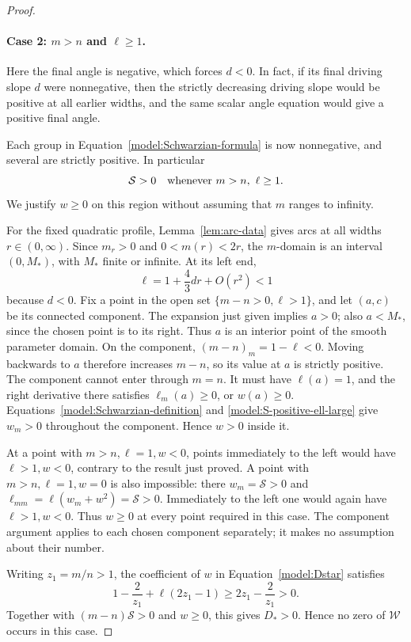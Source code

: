 \begin{proof}
\paragraph{Case 2: \(m>n\) and \(\ell\ge1\).}
Here the final angle is negative, which forces \(d<0\).
In fact, if its final driving slope \(d\) were nonnegative, then the
strictly decreasing driving slope would be positive at all earlier
widths, and the same scalar angle equation would give a positive final
angle.

Each group in Equation~\eqref{model:Schwarzian-formula} is now
nonnegative, and several are strictly positive.  In particular
\begin{equation}
 \mathcal S>0
 \quad\hbox{whenever }m>n,\ \ell\ge1.
 \label{model:S-positive-ell-large}
\end{equation}
We justify \(w\ge0\) on this region without assuming that \(m\)
ranges to infinity.

For the fixed quadratic profile, Lemma~\ref{lem:arc-data} gives arcs at
all widths \(r\in(0,\infty)\).  Since \(m_r>0\) and \(0<m(r)<2r\),
the \(m\)-domain is an interval \((0,M_*)\), with \(M_*\) finite or
infinite.  At its left end,
\[
 \ell=1+\frac43dr+O(r^2)<1
\]
because \(d<0\).
Fix a point in the open set \(\{m-n>0,\ell>1\}\), and let \((a,c)\)
be its connected component.  The expansion just given implies \(a>0\);
also \(a<M_*\), since the chosen point is to its right.
Thus \(a\) is an interior point of the smooth parameter domain.
On the component,
\((m-n)_m=1-\ell<0\).  Moving backwards to \(a\) therefore increases
\(m-n\), so its value at \(a\) is strictly positive.
The component cannot enter through \(m=n\).  It must have
\(\ell(a)=1\), and the right derivative there satisfies
\(\ell_m(a)\ge0\), or \(w(a)\ge0\).
Equations~\eqref{model:Schwarzian-definition} and
\eqref{model:S-positive-ell-large} give \(w_m>0\) throughout the
component.  Hence \(w>0\) inside it.

At a point with \(m>n,\ell=1,w<0\), points immediately to the left
would have \(\ell>1,w<0\), contrary to the result just proved.
A point with \(m>n,\ell=1,w=0\) is also impossible: there
\(w_m=\mathcal S>0\) and
\(\ell_{mm}=\ell(w_m+w^2)=\mathcal S>0\).
Immediately to the left one would again have \(\ell>1,w<0\).
Thus \(w\ge0\) at every point required in this case.
The component argument applies to each chosen component separately;
it makes no assumption about their number.

Writing \(z_1=m/n>1\), the coefficient of \(w\) in
Equation~\eqref{model:Dstar} satisfies
\[
 1-\frac2{z_1}+\ell(2z_1-1)
 \ge 2z_1-\frac2{z_1}>0.
\]
Together with \((m-n)\mathcal S>0\) and \(w\ge0\), this gives
\(D_*>0\).  Hence no zero of \(\mathcal W\) occurs in this case.


\end{proof}
